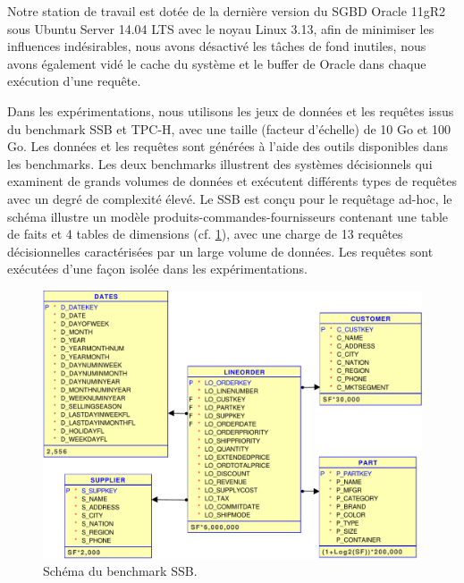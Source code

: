 Notre station de travail est dotée de la dernière version du SGBD Oracle 11gR2 sous Ubuntu Server 14.04 LTS avec le noyau Linux 3.13, afin de minimiser les influences indésirables, nous avons désactivé les tâches de fond inutiles, nous avons également vidé le cache du système et le buffer de Oracle dans chaque exécution d'une requête.

Dans les expérimentations, nous utilisons les jeux de données et les requêtes issus du benchmark SSB et TPC-H, avec une taille (facteur d'échelle) de 10 Go et 100 Go. Les données et les requêtes sont générées à l'aide des outils disponibles dans les benchmarks. Les deux benchmarks illustrent des systèmes décisionnels qui examinent de grands volumes de données et exécutent différents types de requêtes avec un degré de complexité élevé. Le SSB est conçu pour le requêtage ad-hoc, le schéma illustre un modèle produits-commandes-fournisseurs contenant une table de faits et 4 tables de dimensions (cf. \ref{fig:ssb-schema}), avec une charge de 13 requêtes décisionnelles caractérisées par un large volume de données. Les requêtes sont exécutées d'une façon isolée dans les expérimentations.
\begin{figure}
 \centering
 \includegraphics[scale=0.6]{chapitre6/chap6Fig/ssb-schema.pdf}
 \caption{Schéma du benchmark SSB.}
 \label{fig:ssb-schema}
\end{figure}

